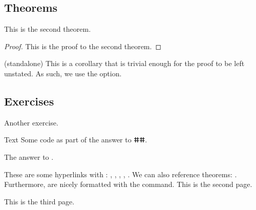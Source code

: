 \subsection{Theorems}
\begin{theorem}
    This is the second theorem.
\end{theorem}
\begin{proof}
    This is the proof to the second theorem.
\end{proof}
\begin{corollary}(standalone)   
    This is a corollary that is trivial enough for the proof to be left unstated. As such, we use the  option.
\end{corollary}
\subsection{Exercises}
\begin{exercise}[label=ex:1.2]
    Another exercise.
\end{exercise}
\begin{code}{Text}
    Some code as part of the answer to ⵌⵌ.
\end{code}
\begin{answer}
    The answer to .
\end{answer}
These are some hyperlinks with : , , , , . We can also reference theorems: . Furthermore,  are nicely formatted with the  command.
\newpage
This is the second page.

\newpage
This is the third page.